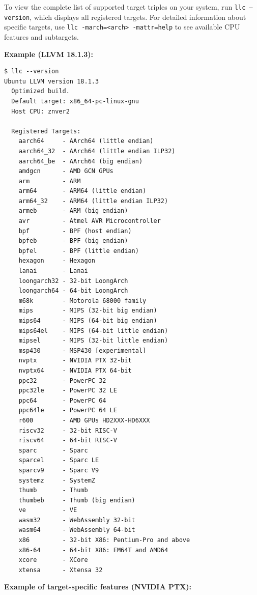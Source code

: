 To view the complete list of supported target triples on your system, run \texttt{llc --version}, which displays all registered targets. For detailed information about specific targets, use \texttt{llc -march=<arch> -mattr=help} to see available CPU features and subtargets.

\textbf{Example (LLVM 18.1.3):}

\begin{lstlisting}[style=ir]
$ llc --version
Ubuntu LLVM version 18.1.3
  Optimized build.
  Default target: x86_64-pc-linux-gnu
  Host CPU: znver2

  Registered Targets:
    aarch64     - AArch64 (little endian)
    aarch64_32  - AArch64 (little endian ILP32)
    aarch64_be  - AArch64 (big endian)
    amdgcn      - AMD GCN GPUs
    arm         - ARM
    arm64       - ARM64 (little endian)
    arm64_32    - ARM64 (little endian ILP32)
    armeb       - ARM (big endian)
    avr         - Atmel AVR Microcontroller
    bpf         - BPF (host endian)
    bpfeb       - BPF (big endian)
    bpfel       - BPF (little endian)
    hexagon     - Hexagon
    lanai       - Lanai
    loongarch32 - 32-bit LoongArch
    loongarch64 - 64-bit LoongArch
    m68k        - Motorola 68000 family
    mips        - MIPS (32-bit big endian)
    mips64      - MIPS (64-bit big endian)
    mips64el    - MIPS (64-bit little endian)
    mipsel      - MIPS (32-bit little endian)
    msp430      - MSP430 [experimental]
    nvptx       - NVIDIA PTX 32-bit
    nvptx64     - NVIDIA PTX 64-bit
    ppc32       - PowerPC 32
    ppc32le     - PowerPC 32 LE
    ppc64       - PowerPC 64
    ppc64le     - PowerPC 64 LE
    r600        - AMD GPUs HD2XXX-HD6XXX
    riscv32     - 32-bit RISC-V
    riscv64     - 64-bit RISC-V
    sparc       - Sparc
    sparcel     - Sparc LE
    sparcv9     - Sparc V9
    systemz     - SystemZ
    thumb       - Thumb
    thumbeb     - Thumb (big endian)
    ve          - VE
    wasm32      - WebAssembly 32-bit
    wasm64      - WebAssembly 64-bit
    x86         - 32-bit X86: Pentium-Pro and above
    x86-64      - 64-bit X86: EM64T and AMD64
    xcore       - XCore
    xtensa      - Xtensa 32
\end{lstlisting}

\textbf{Example of target-specific features (NVIDIA PTX):}


